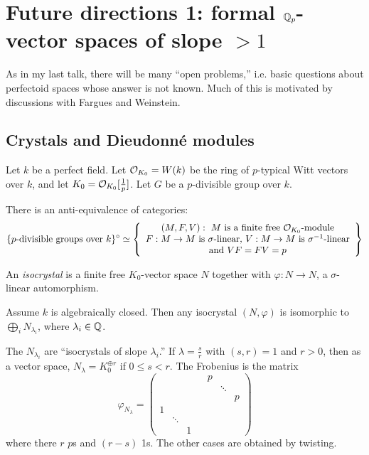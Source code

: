 
\section{Future directions 1: formal \texorpdfstring{$\mathbb{Q}_p$}{Qp}-vector spaces of slope \texorpdfstring{$>1$}{>1}}





As in my last talk, there will be many ``open problems,'' i.e. basic questions 
about perfectoid spaces whose answer is not known. Much of this is motivated by 
discussions with Fargues and Weinstein. 





\subsection{Crystals and Dieudonn\'e modules}

Let $k$ be a perfect field. Let $\mathcal{O}_{K_0}=W(k)$ be the ring of $p$-typical Witt 
vectors over $k$, and let $K_0=\mathcal{O}_{K_0}[\frac 1 p]$. Let $G$ be a $p$-divisible 
group over $k$. 

\begin{theorem}
There is an anti-equivalence of categories:
\[
  \{\text{$p$-divisible groups over $k$}\}^\circ \simeq \left\{\begin{array}{c} (M,F,V) :\text{ $M$ is a finite free $\mathcal{O}_{K_0}$-module} \\ \text{$F:M\to M$ is $\sigma$-linear, $V:M\to M$ is $\sigma^{-1}$-linear} \\ \text{and $V F = F V=p$}\end{array}\right\}
\]
\end{theorem}

\begin{definition}
An \emph{isocrystal} is a finite free $K_0$-vector space $N$ together with 
$\varphi:N\to N$, a $\sigma$-linear automorphism. 
\end{definition}

\begin{theorem}
Assume $k$ is algebraically closed. Then any isocrystal $(N,\varphi)$ is isomorphic 
to $\bigoplus_i N_{\lambda_i}$, where $\lambda_i\in \mathbb{Q}$.
\end{theorem}
The $N_{\lambda_i}$ are ``isocrystals of slope $\lambda_i$.'' If 
$\lambda=\frac s r$ with $(s,r)=1$ and $r>0$, then as a vector space, 
$N_\lambda=K_0^{\oplus r}$ if $0\leqslant s<r$. The Frobenius is the matrix 
\[
  \varphi_{N_\lambda} = 
  \begin{pmatrix}
    & & & & p \\
    & & & & & \ddots \\
    & & & & & & p \\
    1 \\
    & \ddots \\
    & & 1
  \end{pmatrix}
\]
where there $r$ $p$s and $(r-s)$ 1s. The other cases are obtained by twisting. 

